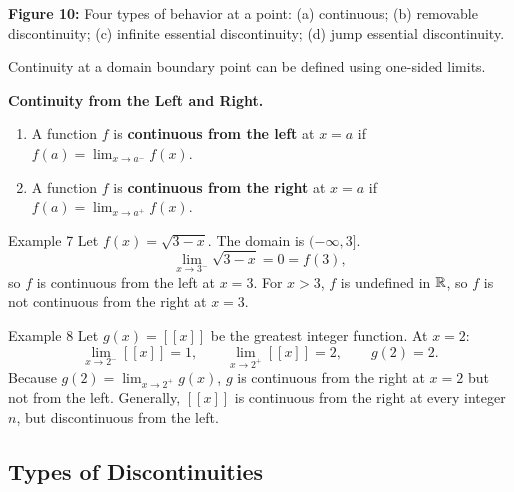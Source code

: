 \begin{center}
\begin{minipage}{0.48\linewidth}
\end{minipage}

\smallskip
\textbf{Figure 10:} Four types of behavior at a point: (a) continuous; (b) removable discontinuity; (c) infinite essential discontinuity; (d) jump essential discontinuity.
\end{center}
\bigskip

Continuity at a domain boundary point can be defined using one-sided limits.

\medskip
\noindent\textbf{Continuity from the Left and Right.}
\begin{enumerate}
    \item A function \(f\) is \textbf{continuous from the left} at \(x = a\) if \(f(a) = \displaystyle\lim_{x \to a^{-}} f(x)\).
    \item A function \(f\) is \textbf{continuous from the right} at \(x = a\) if \(f(a) = \displaystyle\lim_{x \to a^{+}} f(x)\).
\end{enumerate}

\begin{examplebox}{Example 7}
Let \(f(x) = \sqrt{3 - x}\). The domain is \((-\infty, 3]\).
\[
\lim_{x \to 3^{-}} \sqrt{3 - x} = 0 = f(3),
\]
so \(f\) is continuous from the left at \(x = 3\). For \(x > 3\), \(f\) is undefined in \(\mathbb{R}\), so \(f\) is not continuous from the right at \(x = 3\).
\end{examplebox}

\begin{examplebox}{Example 8}
Let \(g(x) = [\![x]\!]\) be the greatest integer function. At \(x = 2\):
\[
\lim_{x \to 2^{-}} [\![x]\!] = 1, \qquad
\lim_{x \to 2^{+}} [\![x]\!] = 2, \qquad
g(2) = 2.
\]
Because \(g(2) = \displaystyle\lim_{x \to 2^{+}} g(x)\), \(g\) is continuous from the right at \(x = 2\) but not from the left. Generally, \([\![x]\!]\) is continuous from the right at every integer \(n\), but discontinuous from the left.
\end{examplebox}


\subsection*{Types of Discontinuities}
\label{subsec:1.5.2}


